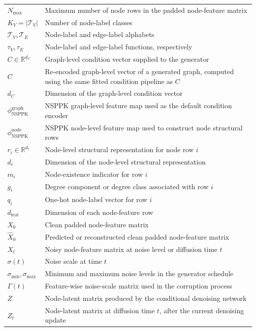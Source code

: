 \begin{tabularx}{\textwidth}{@{}L X@{}}
$N_{\max}$ & Maximum number of node rows in the padded node-feature matrix \\
$K_V=|\mathcal{T}_V|$ & Number of node-label classes \\
$\mathcal{T}_V,\mathcal{T}_E$ & Node-label and edge-label alphabets \\
$\tau_V,\tau_E$ & Node-label and edge-label functions, respectively \\
$C\in\mathbb{R}^{d_C}$ & Graph-level condition vector supplied to the generator \\
$\hat{C}$ & Re-encoded graph-level vector of a generated graph, computed using the same fitted condition pipeline as \(C\) \\
$d_C$ & Dimension of the graph-level condition vector \\
$\phi_{\mathrm{NSPPK}}^{\mathrm{graph}}$ & NSPPK graph-level feature map used as the default condition encoder \\
$\phi_{\mathrm{NSPPK}}^{\mathrm{node}}$ & NSPPK node-level feature map used to construct node structural rows \\
$r_i\in\mathbb{R}^{d_r}$ & Node-level structural representation for node row $i$ \\
$d_r$ & Dimension of the node-level structural representation \\
$m_i$ & Node-existence indicator for row $i$ \\
$g_i$ & Degree component or degree class associated with row $i$ \\
$q_i$ & One-hot node-label vector for row $i$ \\
$d_{\mathrm{feat}}$ & Dimension of each node-feature row \\
$X_0$ & Clean padded node-feature matrix \\
$\hat{X}_0$ & Predicted or reconstructed clean padded node-feature matrix \\
$X_t$ & Noisy node-feature matrix at noise level or diffusion time $t$ \\
$\sigma(t)$ & Noise scale at time $t$ \\
$\sigma_{\min},\sigma_{\max}$ & Minimum and maximum noise levels in the generator schedule \\
$\Gamma(t)$ & Feature-wise noise-scale matrix used in the corruption process \\
$Z$ & Node-latent matrix produced by the conditional denoising network \\
$Z_t$ & Node-latent matrix at diffusion time \(t\), after the current denoising update \\

\end{tabularx}
